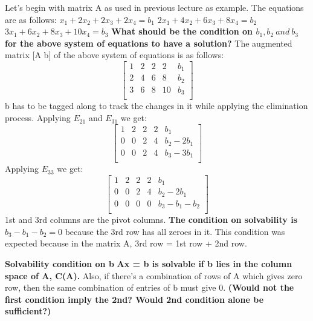 \documentclass{article}
\begin{document}
Let's begin with matrix A as used in previous lecture as example. The equations are as follows: \newline
$x_1 + 2x_2 + 2x_3 + 2x_4 = b_1$ \newline
$2x_1 + 4x_2 + 6x_3 + 8x_4 = b_2$ \newline
$3x_1 + 6x_2 + 8x_3 + 10x_4 = b_3$ \newline
\textbf{What should be the condition on $b_1, b_2\ and\ b_3$ for the above system of equations to have a solution?} The augmented matrix [A b] of the above system of equations is as follows: \newline
\[ 
        \begin{bmatrix}
        1 & 2 & 2 & 2 & b_1\\
        2 & 4 & 6 & 8 & b_2\\
        3 & 6 & 8 & 10 & b_3\\
        \end{bmatrix}
        \]
b has to be tagged along to track the changes in it while applying the elimination process. 
Applying $E_{21}$ and $E_{31}$ we get:
\[ 
        \begin{bmatrix}
        1 & 2 & 2 & 2 & b_1\\
        0 & 0 & 2 & 4 & b_2 - 2b_1\\
        0 & 0 & 2 & 4 & b_3 - 3b_1\\
        \end{bmatrix}
        \]
Applying $E_{33}$ we get:
\[ 
        \begin{bmatrix}
        1 & 2 & 2 & 2 & b_1\\
        0 & 0 & 2 & 4 & b_2 - 2b_1\\
        0 & 0 & 0 & 0 & b_3 - b_1 - b_2\\
        \end{bmatrix}
        \]
1st and 3rd columns are the pivot columns. \textbf{The condition on solvability is }
$b_3 - b_1 - b_2 = 0$ because the 3rd row has all zeroes in it. This condition was expected because in the matrix A, 3rd row = 1st row + 2nd row. \newline

\textbf{Solvability condition on b}\newline
\textbf{Ax = b is solvable if b lies in the column space of A, C(A). }\newline
Also, if there's a combination of rows of A which gives zero row, then the same combination of entries of b must give 0. \newline
\textbf{(Would not the first condition imply the 2nd? Would 2nd condition alone be sufficient?)}
\end{document}
